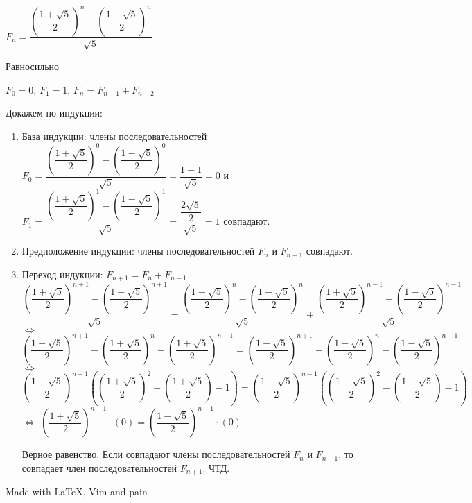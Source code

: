\documentclass[a4paper,12pt]{article}
\begin{document}
\begin{center}
$F_n = \dfrac{\left(\dfrac{1 + \sqrt{5}}{2}\right)^n - \left(\dfrac{1 - \sqrt{5}}{2}\right)^n}{\sqrt{5}}$
\begin{flushleft}
Равносильно
\end{flushleft}
$F_0 = 0$, $F_1 = 1$, $F_n = F_{n - 1} + F_{n - 2}$
\begin{flushleft}
Докажем по индукции:
\begin{enumerate}
	\item База индукции:
		члены последовательностей
		$F_0 = \dfrac{\left(\dfrac{1 + \sqrt{5}}{2}\right)^0 - \left(\dfrac{1 - \sqrt{5}}{2}\right)^0}{\sqrt{5}} = 
		\dfrac{1 - 1}{\sqrt{5}} = 0$ и 
		$F_1 = \dfrac{\left(\dfrac{1 + \sqrt{5}}{2}\right)^1 - \left(\dfrac{1 - \sqrt{5}}{2}\right)^1}{\sqrt{5}} = 
		\dfrac{\dfrac{2 \sqrt{5}}{2}}{\sqrt{5}} = 1$ совпадают.
	\item Предположение индукции: члены последовательностей $F_n$ и $F_{n - 1}$ совпадают.
	\item Переход индукции:
		$F_{n + 1} = F_{n} + F_{n - 1}$
		$\dfrac{\left(\dfrac{1 + \sqrt{5}}{2}\right)^{n + 1} - \left(\dfrac{1 - \sqrt{5}}{2}\right)^{n + 1}}{\sqrt{5}} =
		 \dfrac{\left(\dfrac{1 + \sqrt{5}}{2}\right)^n - \left(\dfrac{1 - \sqrt{5}}{2}\right)^n}{\sqrt{5}} + 
		 \dfrac{\left(\dfrac{1 + \sqrt{5}}{2}\right)^{n - 1} - \left(\dfrac{1 - \sqrt{5}}{2}\right)^{n - 1}}{\sqrt{5}}$
		$\Leftrightarrow$
		$\left(\dfrac{1 + \sqrt{5}}{2}\right)^{n + 1} - \left(\dfrac{1 + \sqrt{5}}{2}\right)^{n} - 
		 \left(\dfrac{1 + \sqrt{5}}{2}\right)^{n - 1} = \left(\dfrac{1 - \sqrt{5}}{2}\right)^{n + 1} - 
		 \left(\dfrac{1 - \sqrt{5}}{2}\right)^{n} - \left(\dfrac{1 - \sqrt{5}}{2}\right)^{n - 1}$
		$\Leftrightarrow$
		$\left(\dfrac{1 + \sqrt{5}}{2}\right)^{n - 1} \left( \left(\dfrac{1 + \sqrt{5}}{2}\right)^{2} - 
		 \left(\dfrac{1 + \sqrt{5}}{2}\right) - 1 \right) = \left(\dfrac{1 - \sqrt{5}}{2}\right)^{n - 1} 
		 \left( \left(\dfrac{1 - \sqrt{5}}{2}\right)^{2} - \left(\dfrac{1 - \sqrt{5}}{2}\right) - 1 \right)$
		$\Leftrightarrow$
		$\left(\dfrac{1 + \sqrt{5}}{2}\right)^{n - 1} \cdot \left(0\right) = 
		 \left(\dfrac{1 - \sqrt{5}}{2}\right)^{n - 1} \cdot \left(0\right)$
		\begin{center}
		Верное равенство. Если совпадают члены последовательностей $F_n$ и $F_{n - 1}$, 
		то совпадает член последовательностей $F_{n + 1}$.
		ЧТД.
		\end{center}
\end{enumerate}
\end{flushleft}
\end{center}
\begin{center}
Made with \LaTeX{}, Vim and pain
\end{center}
\end{document}

